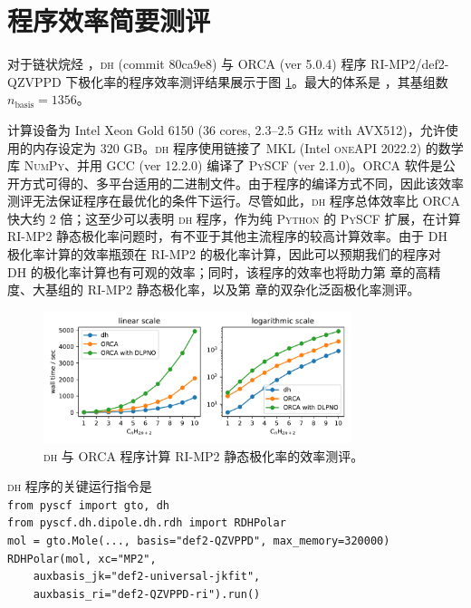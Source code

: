 \section{程序效率简要测评}
\label{sec.3.efficiency}

对于链状烷烃 ，\textsc{dh} (commit 80ca9e8) 与 \textsc{ORCA} (ver 5.0.4) 程序 RI-MP2/def2-QZVPPD 下极化率的程序效率测评结果展示于图 \ref{fig.3.timing-polar-chain}。最大的体系是 ，其基组数 $n_\mathrm{basis} = 1356$。

计算设备为 Intel Xeon Gold 6150 (36 cores, 2.3--2.5 GHz with AVX512)，允许使用的内存设定为 320 GB。\textsc{dh} 程序使用链接了 \textsc{MKL} (Intel \textsc{oneAPI} 2022.2) 的数学库 \textsc{NumPy}、并用 \textsc{GCC} (ver 12.2.0) 编译了 \textsc{PySCF} (ver 2.1.0)。\textsc{ORCA} 软件是公开方式可得的、多平台适用的二进制文件。由于程序的编译方式不同，因此该效率测评无法保证程序在最优化的条件下运行。尽管如此，\textsc{dh} 程序总体效率比 \textsc{ORCA} 快大约 2 倍；这至少可以表明 \textsc{dh} 程序，作为纯 \textsc{Python} 的 \textsc{PySCF} 扩展，在计算 RI-MP2 静态极化率问题时，有不亚于其他主流程序的较高计算效率。由于 DH 极化率计算的效率瓶颈在 RI-MP2 的极化率计算，因此可以预期我们的程序对 DH 的极化率计算也有可观的效率；同时，该程序的效率也将助力第  章的高精度、大基组的 RI-MP2 静态极化率，以及第  章的双杂化泛函极化率测评。

\begin{figure}[!ht]
    \centering
    \includegraphics[width=0.8\textwidth]{assets/timing-polar-chain.pdf}
    \caption[\textsc{dh} 与 \textsc{ORCA} 程序计算 RI-MP2 静态极化率的效率测评]{\textsc{dh} 与 \textsc{ORCA} 程序计算 RI-MP2 静态极化率的效率测评。}
    \label{fig.3.timing-polar-chain}
\end{figure}

\textsc{dh} 程序的关键运行指令是\\
\verb|from pyscf import gto, dh|\\
\verb|from pyscf.dh.dipole.dh.rdh import RDHPolar|\\
\verb|mol = gto.Mole(..., basis="def2-QZVPPD", max_memory=320000)|\\
\verb|RDHPolar(mol, xc="MP2",|\\
\verb|    auxbasis_jk="def2-universal-jkfit",|\\
\verb|    auxbasis_ri="def2-QZVPPD-ri").run()|

